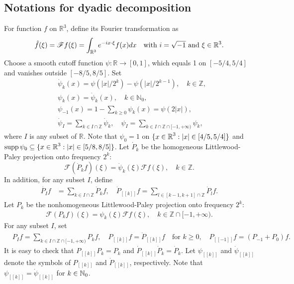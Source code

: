 \documentclass[11pt,twoside]{article}
\def\N{\mathop{\mathbb N\kern 0pt}\nolimits}
\def\R{\mathop{\mathbb R\kern 0pt}\nolimits}
\newcommand{\pk}{\dot{P}_k}
\newcommand{\Pk}{P_k}
\DeclareMathOperator{\supp}{supp}
\theoremstyle{plain}
\theoremstyle{definition}
\theoremstyle{assumption}
\numberwithin{equation}{section}
\begin{document}
	\subsection{Notations for dyadic decomposition}\label{subsec:Notations-for-dyadic-decomposition}
	For function $f$ on $\mathbb{R}^3$, define its Fourier transformation as
	\begin{align*}
		\hat{f}(\xi)=\mathscr{F}f(\xi)=\int_{\mathbb{R}^3} e^{-i x\cdot\xi}f(x)dx\quad\text{with $i=\sqrt{-1}$ and $\xi\in\Bbb R^3$}.
	\end{align*}
	Choose a smooth cutoff function $\psi\colon\mathbb{R}\rightarrow[0,1]$, which equals 1 on $[-5/4,5/4]$ and vanishes outside
	$[-8/5,8/5]$. Set
	\begin{align*}
		&\dot{\psi}_{k}(x)=\psi(|x|/2^{k})-\psi(|x|/2^{k-1}),\quad k\in\mathbb{Z},\\
		&\psi_{k}(x)=\dot{\psi}_k(x),\quad k\in\mathbb{N}_0,\\
		&\psi_{-1}(x)=1-\sum_{k\geq 0}\psi_{k}(x)=\psi(2|x|),\\
		&\dot{\psi}_{I}=\sum_{k\in I\cap\mathbb{Z}}\dot{\psi}_{k}, \quad {\psi}_{I}=\sum_{k\in I\cap\mathbb{Z}\cap[-1,+\infty)}{\psi}_{k},
	\end{align*}
	where $I$ is any subset of $\mathbb{R}$. Note that $\psi_0=1$ on $\{x\in\R^3:|x|\in[4/5,5/4]\}$ and $\supp\psi_0\subseteq\{x\in\R^3:|x|\in [5/8,8/5]\}$. Let $\pk$ be the homogeneous
	Littlewood-Paley projection onto frequency $2^k$:
	\begin{equation*}
		\mathscr{F}(\pk f)(\xi)=\dot{\psi}_{k}(\xi)\mathscr{F}f(\xi),\quad k\in\mathbb{Z}.
	\end{equation*}
	In addition, for any subset $I$, define
	\begin{align*}
		\dot{P_I}f&=\sum_{k\in I\cap\mathbb{Z}}\pk f,\quad
		\dot{P}_{[[k]]}f=\sum_{l\in[k-1,k+1]\cap\mathbb{Z}}\dot{P}_l f.
	\end{align*}
	Let $\Pk$ be the nonhomogeneous
	Littlewood-Paley projection onto frequency $2^k$:
	\begin{equation}\label{YHCCC-001}
		\begin{split}
			\mathscr{F}(\Pk f)(\xi)={\psi}_{k}(\xi)\mathscr{F}f(\xi),\quad k\in\mathbb{Z}\cap[-1,+\infty).
		\end{split}
	\end{equation}
	For any subset $I$, set
	\begin{align*}
		&P_I f=\sum_{k\in I\cap\mathbb{Z}\cap\lbrack-1,+\infty)}\Pk f,\quad
		P_{[[k]]}f= \dot{P}_{[[k]]}f\quad\text{for $k\geq 0$},\quad
		P_{[[-1]]}f= (P_{-1}+P_{0})f.
	\end{align*}
	It is easy to check that $P_{[[k]]}P_k=P_k$ and $\dot{P}_{[[k]]}\dot{P}_k=\dot{P}_k$.
	Let $\psi_{[[k]]}$ and $\dot{\psi}_{[[k]]}$ denote the symbols of $P_{[[k]]}$ and $\dot{P}_{[[k]]}$, respectively. Note that $\psi_{[[k]]} = \dot{\psi}_{[[k]]}$ for $k\in\N_0$.
	
\end{document}
